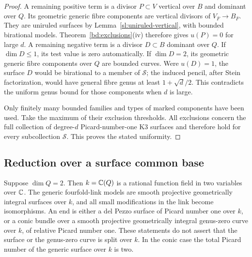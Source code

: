 \begin{proof}
A remaining positive term is a divisor $P\subset V$ vertical over
$B$ and dominant over $Q$.  Its geometric generic fibre components
are vertical divisors of $V_{\overline F}\to B_{\overline F}$.
They are uniruled surfaces by Lemma~\ref{sl:uniruled-vertical}, with
bounded birational models.  Theorem~\ref{bd:exclusions}\textup{(iv)}
therefore gives $u(P)=0$ for large $d$.  A remaining negative term is a divisor
$D\subset B$ dominant over $Q$.  If $\dim D\le1$, its test value is
zero automatically.  If $\dim D=2$, its geometric generic fibre
components over $Q$ are bounded curves.  Were $u(D)=1$, the surface
$D$ would be birational to a member of $\mathcal S$; the induced
pencil, after Stein factorization, would have general fibre genus at
least $1+\sqrt d/2$.  This contradicts the uniform genus bound for
those components when $d$ is large.

Only finitely many bounded families and types of marked components
have been used.  Take the maximum of their exclusion thresholds.
All exclusions concern the full collection of degree-$d$
Picard-number-one K3 surfaces and therefore hold for every
subcollection $\mathcal S$.  This proves the stated uniformity.
\end{proof}

\subsection{Reduction over a surface common base}

\begin{lemma}
\label{sl:generic-surface-reduction}
Suppose $\dim Q=2$.  Then $k=\mathbb C(Q)$ is a rational function field in
two variables over $\mathbb C$.  The generic fourfold-link models are smooth
projective geometrically integral surfaces over $k$, and all small
modifications in the link become isomorphisms.  An end is either a
del Pezzo surface of Picard number one over $k$, or a conic bundle
over a smooth projective geometrically integral genus-zero curve
over $k$, of relative Picard number one.  These statements do not
assert that the surface or the genus-zero curve is split over $k$.
In the conic case the total Picard number of the generic surface over
$k$ is two.
\end{lemma}

